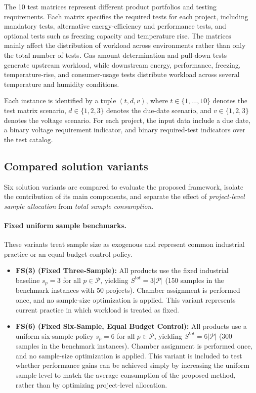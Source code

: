 \documentclass[11pt]{article}
\begin{document}
The 10 test matrices represent different product portfolios and testing requirements. Each matrix specifies the required tests for each project, including mandatory tests, alternative energy-efficiency and performance tests, and optional tests such as freezing capacity and temperature rise. The matrices mainly affect the distribution of workload across environments rather than only the total number of tests. Gas amount determination and pull-down tests generate upstream workload, while downstream energy, performance, freezing, temperature-rise, and consumer-usage tests distribute workload across several temperature and humidity conditions.

Each instance is identified by a tuple \((t,d,v)\), where \(t\in\{1,\ldots,10\}\) denotes the test matrix scenario, \(d\in\{1,2,3\}\) denotes the due-date scenario, and \(v\in\{1,2,3\}\) denotes the voltage scenario. For each project, the input data include a due date, a binary voltage requirement indicator, and binary required-test indicators over the test catalog.

\subsection{Compared solution variants}
\label{subsec:methods}

Six solution variants are compared to evaluate the proposed framework, isolate the contribution of its main components, and separate the effect of \emph{project-level sample allocation} from \emph{total sample consumption}.

\paragraph{Fixed uniform sample benchmarks.}
These variants treat sample size as exogenous and represent common industrial practice or an equal-budget control policy.

\begin{itemize}
    \item \textbf{FS(3) (Fixed Three-Sample):}
    All products use the fixed industrial baseline \(s_p=3\) for all \(p\in\mathcal{P}\), yielding \(S^{tot}=3|\mathcal{P}|\) (150 samples in the benchmark instances with 50 projects). Chamber assignment is performed once, and no sample-size optimization is applied. This variant represents current practice in which workload is treated as fixed.

    \item \textbf{FS(6) (Fixed Six-Sample, Equal Budget Control):}
    All products use a uniform six-sample policy \(s_p=6\) for all \(p\in\mathcal{P}\), yielding \(S^{tot}=6|\mathcal{P}|\) (300 samples in the benchmark instances). Chamber assignment is performed once, and no sample-size optimization is applied. This variant is included to test whether performance gains can be achieved simply by increasing the uniform sample level to match the average consumption of the proposed method, rather than by optimizing project-level allocation.
\end{itemize}
\end{document}
